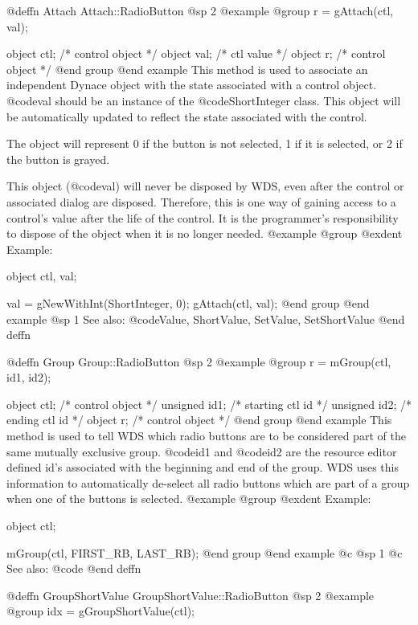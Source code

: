{@deffn {Attach} Attach::RadioButton
@sp 2
@example
@group
r = gAttach(ctl, val);

object  ctl;   /*  control object  */
object  val;   /*  ctl value       */
object  r;     /*  control object  */
@end group
@end example
This method is used to associate an independent Dynace object with the
state associated with a control object.  @code{val} should be an
instance of the @code{ShortInteger} class.  This object will be
automatically updated to reflect the state associated with the control.

The object will represent 0 if the button is not selected, 1 if it is
selected, or 2 if the button is grayed.

This object (@code{val}) will never be disposed by WDS, even after
the control or associated dialog are disposed.  Therefore, this
is one way of gaining access to a control's value after the life
of the control.  It is the programmer's responsibility to dispose of
the object when it is no longer needed.
@example
@group
@exdent Example:

object  ctl, val;

val = gNewWithInt(ShortInteger, 0);
gAttach(ctl, val);
@end group
@end example
@sp 1
See also:  @code{Value, ShortValue, SetValue, SetShortValue}
@end deffn











@deffn {Group} Group::RadioButton
@sp 2
@example
@group
r = mGroup(ctl, id1, id2);

object  ctl;    /*  control object   */
unsigned id1;   /*  starting ctl id  */
unsigned id2;   /*  ending ctl id    */
object  r;      /*  control object   */
@end group
@end example
This method is used to tell WDS which radio buttons are to be considered
part of the same mutually exclusive group.  @code{id1} and @code{id2}
are the resource editor defined id's associated with the beginning and
end of the group.  WDS uses this information to automatically de-select
all radio buttons which are part of a group when one of the buttons is
selected.
@example
@group
@exdent Example:

object  ctl;

mGroup(ctl, FIRST_RB, LAST_RB);
@end group
@end example
@c @sp 1
@c See also:  @code{}
@end deffn



@deffn {GroupShortValue} GroupShortValue::RadioButton
@sp 2
@example
@group
idx = gGroupShortValue(ctl);

}
